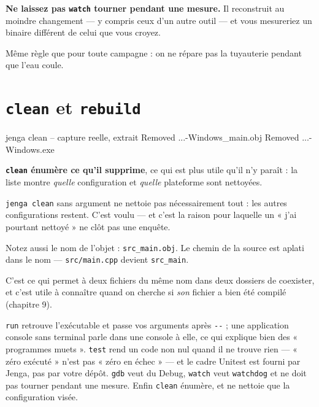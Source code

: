 \begin{nkpiege}
\textbf{Ne laissez pas \texttt{watch} tourner pendant une mesure.} Il reconstruit
au moindre changement --- y compris ceux d'un autre outil --- et vous mesureriez
un binaire différent de celui que vous croyez.

Même règle que pour toute campagne : on ne répare pas la tuyauterie pendant que
l'eau coule.
\end{nkpiege}

\section{\texttt{clean} et \texttt{rebuild}}

\begin{nkcode}{jenga clean -- capture reelle, extrait}
Removed ...\Build\Obj\Release-Windows\Bonjour\src_main.obj
Removed ...\Build\Bin\Release-Windows\Bonjour\Bonjour.exe
\end{nkcode}

\begin{nkretenir}
\textbf{\texttt{clean} énumère ce qu'il supprime}, ce qui est plus utile qu'il
n'y paraît : la liste montre \emph{quelle} configuration et \emph{quelle}
plateforme sont nettoyées.

\texttt{jenga clean} sans argument ne nettoie pas nécessairement tout : les
autres configurations restent. C'est voulu --- et c'est la raison pour laquelle
un « j'ai pourtant nettoyé » ne clôt pas une enquête.
\end{nkretenir}

\begin{nkretenir}
Notez aussi le nom de l'objet : \texttt{src\_main.obj}. Le chemin de la source
est aplati dans le nom --- \texttt{src/main.cpp} devient \texttt{src\_main}.

C'est ce qui permet à deux fichiers du même nom dans deux dossiers de coexister,
et c'est utile à connaître quand on cherche si \emph{son} fichier a bien été
compilé (chapitre 9).
\end{nkretenir}

\begin{nkbilan}
\texttt{run} retrouve l'exécutable et passe vos arguments après \texttt{-{}-} ;
une application console sans terminal parle dans une console à elle, ce qui
explique bien des « programmes muets ». \texttt{test} rend un code non nul quand
il ne trouve rien --- « zéro exécuté » n'est pas « zéro en échec » --- et le cadre
Unitest est fourni par Jenga, pas par votre dépôt. \texttt{gdb} veut du Debug,
\texttt{watch} veut \texttt{watchdog} et ne doit pas tourner pendant une mesure.
Enfin \texttt{clean} énumère, et ne nettoie que la configuration visée.
\end{nkbilan}

